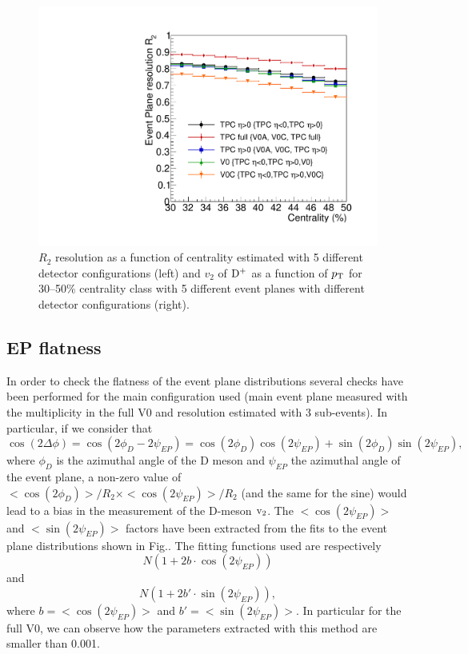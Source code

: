 \begin{figure}
\centering
  \includegraphics[width=.45\textwidth]{FigCap5/EPresolution_comparison.pdf}
\caption{$R_2$ resolution as a function of centrality estimated with 5 different detector configurations (left) and $v_2$ of ${\rm D^+}$ as a function of $p_{\rm T}$ for 30--50\% centrality class with 5 different event planes with different detector configurations (right).}
\label{fig:dplus-4ep}
\end{figure}

\subsection{EP flatness}
\label{sec:EPflat}
In order to check the flatness of the event plane 
distributions several checks have been performed 
for the main configuration used (main event plane 
measured with the multiplicity in the full V0 and
 resolution estimated with 3 sub-events). In particular, if we consider that
\begin{equation}
\cos(2\Delta\phi) = \cos(2\phi_D-2\psi_{EP}) = \cos(2\phi_D)\cos(2\psi_{EP})+\sin(2\phi_D)\sin(2\psi_{EP}),
\end{equation}
where $\phi_D$ is the azimuthal angle of the D meson 
and $\psi_{EP}$ the azimuthal angle of the event plane, 
a non-zero value of 
$< \cos(2\phi_D) >/R_2 \times < \cos(2\psi_{EP}) >/R_2$ 
(and the same for the sine) would lead to a bias in the 
measurement of the D-meson $\rm v_2$. The  
$< \cos(2\psi_{EP}) >$ and $< \sin(2\psi_{EP}) >$ factors 
have been extracted from the fits to the event plane 
distributions shown in Fig.. The fitting functions used are respectively 
\begin{equation}
N(1+2b\cdot \cos(2\psi_{EP}))
\end{equation}
and 
\begin{equation}
N(1+2b'\cdot \sin(2\psi_{EP})),
\end{equation}
where $b = < \cos(2\psi_{EP}) >$ and $b' = < \sin(2\psi_{EP}) >$.
In particular for the full V0, we can observe how the parameters 
extracted with this method are smaller than 0.001.


